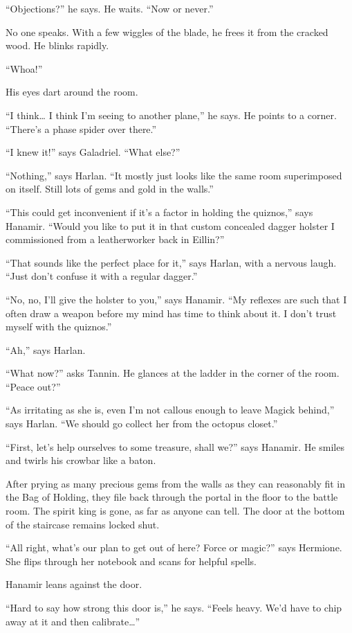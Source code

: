 \documentclass[smalldemyvopaper,11pt,twoside,onecolumn,openright,extrafontsizes]{memoir}
\begin{document}
``Objections?'' he says. He waits. ``Now or never.''

No one speaks. With a few wiggles of the blade, he frees it from the
cracked wood. He blinks rapidly.

``Whoa!''

His eyes dart around the room.

``I think\ldots{} I think I'm seeing to another plane,'' he says. He
points to a corner. ``There's a phase spider over there.''

``I knew it!'' says Galadriel. ``What else?''

``Nothing,'' says Harlan. ``It mostly just looks like the same room
superimposed on itself. Still lots of gems and gold in the walls.''

``This could get inconvenient if it's a factor in holding the quiznos,''
says Hanamir. ``Would you like to put it in that custom concealed dagger
holster I commissioned from a leatherworker back in Eillin?''

``That sounds like the perfect place for it,'' says Harlan, with a
nervous laugh. ``Just don't confuse it with a regular dagger.''

``No, no, I'll give the holster to you,'' says Hanamir. ``My reflexes
are such that I often draw a weapon before my mind has time to think
about it. I don't trust myself with the quiznos.''

``Ah,'' says Harlan.

``What now?'' asks Tannin. He glances at the ladder in the corner of the
room. ``Peace out?''

``As irritating as she is, even I'm not callous enough to leave Magick
behind,'' says Harlan. ``We should go collect her from the octopus
closet.''

``First, let's help ourselves to some treasure, shall we?'' says
Hanamir. He smiles and twirls his crowbar like a baton.

After prying as many precious gems from the walls as they can reasonably
fit in the Bag of Holding, they file back through the portal in the
floor to the battle room. The spirit king is gone, as far as anyone can
tell. The door at the bottom of the staircase remains locked shut.

``All right, what's our plan to get out of here? Force or magic?'' says
Hermione. She flips through her notebook and scans for helpful spells.

Hanamir leans against the door.

``Hard to say how strong this door is,'' he says. ``Feels heavy. We'd
have to chip away at it and then calibrate\ldots{}''
\end{document}
